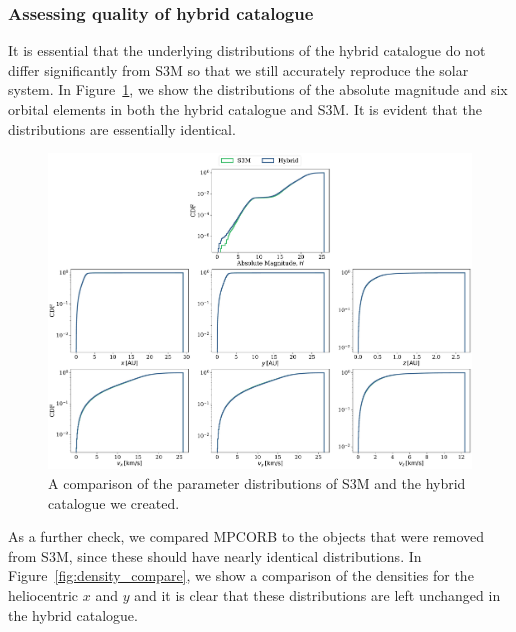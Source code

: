 \documentclass[twocolumn, twocolappendix]{aastex631}
\begin{document}
\subsubsection{Assessing quality of hybrid catalogue}
It is essential that the underlying distributions of the hybrid catalogue do not differ significantly from S3M so that we still accurately reproduce the solar system. In Figure~\ref{fig:hybrid_vs_s3m_dists}, we show the distributions of the absolute magnitude and six orbital elements in both the hybrid catalogue and S3M. It is evident that the distributions are essentially identical.

\begin{figure}[htb]
    \centering
    \includegraphics[width=\textwidth]{hybrid_vs_s3m_distributions.pdf}
    \caption{A comparison of the parameter distributions of S3M \citep{Granvik+2009} and the hybrid catalogue we created.}
    \label{fig:hybrid_vs_s3m_dists}
\end{figure}

As a further check, we compared MPCORB to the objects that were removed from S3M, since these should have nearly identical distributions. In Figure~\ref{fig:density_compare}, we show a comparison of the densities for the heliocentric $x$ and $y$ and it is clear that these distributions are left unchanged in the hybrid catalogue.
\end{document}
